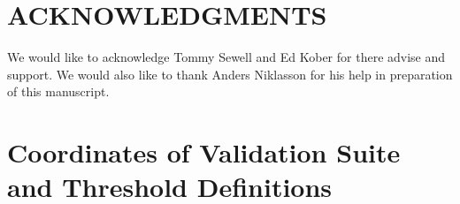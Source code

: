 \documentclass[prb,aps,nobibnotes,twocolumn,doublespace,twocolumngrid,superbib]{revtex4}
\begin{document}
\section*{ACKNOWLEDGMENTS}

We would like to acknowledge Tommy Sewell and Ed Kober for there advise
and support. We would also like to thank Anders Niklasson for his help
in preparation of this manuscript. 

 
 

\appendix

\section{Coordinates of Validation Suite and Threshold Definitions}\label{Coordinates}
%
%
%
\begin{table}[p]
\caption{Fractional coordinates for the triclinic 2 atom unit cell of MgO, cooresponding to the 
         calculations reported in Table~\ref{MgOTable}.  Length of the unit cell is 
         $a=b=c=2.977776807$\AA, with angles $\alpha=\beta=\gamma=60^\circ$.}
\end{table}

\begin{table}[p]
\caption{Fractional coordinates for the cubic 8 atom unit cell of MgO, cooresponding to the 
         calculations reported in Table~\ref{MgOTable}.  Length of the unit cell is 
         $a=b=c=4.21121$\AA, with angles $\alpha=\beta=\gamma=90^\circ$.}
\end{table}
\end{document}
